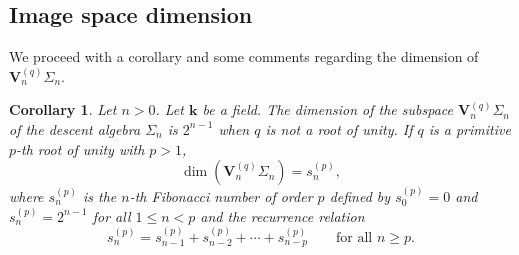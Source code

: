 \documentclass[revision]{FPSAC2025}
\newtheorem{corollary}{Corollary}
\begin{document}
\subsection{Image space dimension}
We proceed with a corollary and some comments regarding the dimension of $\mathbf{V}_n^{(q)}\Sigma_n$. 
\begin{corollary}
\label{corollary.rank}
Let $n>0$. Let $\mathbf{k}$ be a field. The dimension of the subspace $\mathbf{V}_n^{(q)}\Sigma_n$ of the descent algebra $\Sigma_n$ is $2^{n-1}$ when $q$ is not a root of unity.
If $q$ is a primitive $p$-th root of unity with $p>1$,
\begin{equation}
\dim\left(\mathbf{V}_n^{(q)}\Sigma_n\right) = s_n^{(p)},
\end{equation}
where $s_n^{(p)}$ is the $n$-th Fibonacci number of order $p$ defined by $s_0^{(p)} = 0$ and $s_n^{(p)} = 2^{n-1}$ for all $1 \leq n < p$ and the recurrence relation
%
\begin{equation*}
s^{(p)}_n = 
s^{(p)}_{n-1} + s^{(p)}_{n-2} + \cdots + s^{(p)}_{n-p} %
\qquad \text{for all } n \geq p.
\end{equation*}
%
\end{corollary}
\end{document}
